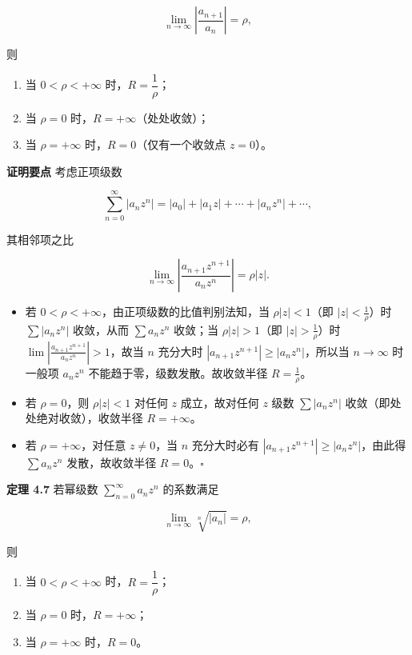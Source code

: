 \[
\lim_{n\to\infty}\left|\frac{a_{n+1}}{a_n}\right|=\rho ,
\]

则

\begin{enumerate}
\def\labelenumi{\arabic{enumi}.}
\tightlist
\item
  当 \(0<\rho<+\infty\) 时，\(R=\dfrac{1}{\rho}\)；
\item
  当 \(\rho=0\) 时，\(R=+\infty\)（处处收敛）；
\item
  当 \(\rho=+\infty\) 时，\(R=0\)（仅有一个收敛点 \(z=0\)）。
\end{enumerate}

\textbf{证明要点} 考虑正项级数

\[
\sum_{n=0}^{\infty}|a_n z^n|=|a_0|+|a_1 z|+\cdots+|a_n z^n|+\cdots,
\]

其相邻项之比

\[
\lim_{n\to\infty}\left|\frac{a_{n+1}z^{n+1}}{a_n z^n}\right|=\rho|z| .
\]

\begin{itemize}
\tightlist
\item
  若 \(0<\rho<+\infty\)，由正项级数的比值判别法知，当 \(\rho|z|<1\)（即
  \(|z|<\frac{1}{\rho}\)）时 \(\sum|a_n z^n|\) 收敛，从而
  \(\sum a_n z^n\) 收敛；当 \(\rho|z|>1\)（即 \(|z|>\frac{1}{\rho}\)）时
  \(\lim\left|\frac{a_{n+1}z^{n+1}}{a_n z^n}\right|>1\)，故当 \(n\)
  充分大时 \(|a_{n+1}z^{n+1}|\ge|a_n z^n|\)，所以当 \(n\to\infty\)
  时一般项 \(a_n z^n\) 不能趋于零，级数发散。故收敛半径
  \(R=\frac{1}{\rho}\)。
\item
  若 \(\rho=0\)，则 \(\rho|z|<1\) 对任何 \(z\) 成立，故对任何 \(z\) 级数
  \(\sum|a_n z^n|\) 收敛（即处处绝对收敛），收敛半径 \(R=+\infty\)。
\item
  若 \(\rho=+\infty\)，对任意 \(z\neq 0\)，当 \(n\) 充分大时必有
  \(|a_{n+1}z^{n+1}|\ge|a_n z^n|\)，由此得 \(\sum a_n z^n\)
  发散，故收敛半径 \(R=0\)。\(\square\)
\end{itemize}

\textbf{定理 4.7} 若幂级数 \(\displaystyle\sum_{n=0}^{\infty}a_n z^n\)
的系数满足

\[
\lim_{n\to\infty}\sqrt[n]{|a_n|}=\rho ,
\]

则

\begin{enumerate}
\def\labelenumi{\arabic{enumi}.}
\tightlist
\item
  当 \(0<\rho<+\infty\) 时，\(R=\dfrac{1}{\rho}\)；
\item
  当 \(\rho=0\) 时，\(R=+\infty\)；
\item
  当 \(\rho=+\infty\) 时，\(R=0\)。
\end{enumerate}

